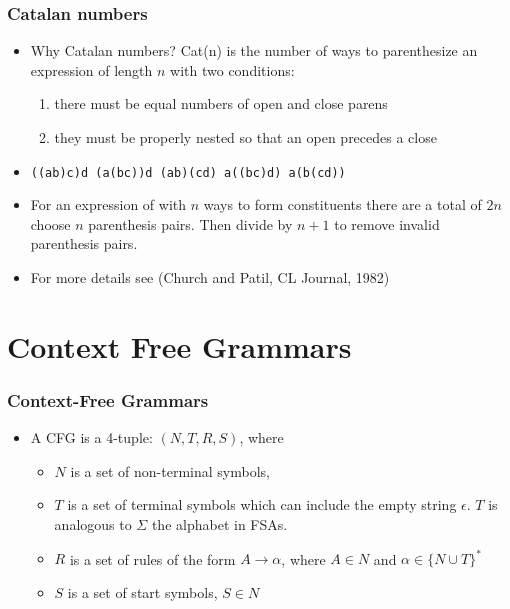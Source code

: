 \begin{frame}
\frametitle{Catalan numbers}
  \begin{itemize}
  \item Why Catalan numbers? Cat(n) is the number of ways to
  parenthesize an expression of length $n$ with two conditions:
  \begin{enumerate}
  \item there must be equal numbers of open and close parens
  \item they must be properly nested so that an open precedes a close
  \end{enumerate}
  \item \texttt{((ab)c)d     (a(bc))d     (ab)(cd)     a((bc)d)     a(b(cd))}
  \item For an expression of with $n$ ways to form constituents there are a total of $2n$
  choose $n$ parenthesis pairs. Then divide by $n+1$ to remove invalid parenthesis pairs.
  \item For more details see (Church and Patil, CL Journal, 1982)
  \end{itemize}

\end{frame}

\section{Context Free Grammars}

\begin{frame}
\frametitle{Context-Free Grammars}
\begin{itemize}
\item A CFG is a 4-tuple: $(N, T, R, S)$, where 
\begin{itemize}
\item $N$ is a set of non-terminal symbols, 
\item $T$ is a set of terminal symbols which can include the empty
  string $\epsilon$. $T$ is analogous to $\Sigma$ the alphabet in FSAs.
\item $R$ is a set of rules of the form $A \rightarrow \alpha$, where $A \in N$ and $\alpha \in \{ N \cup T \}^\ast$
\item $S$ is a set of start symbols, $S \in N$
\end{itemize}
\end{itemize}

\end{frame}


